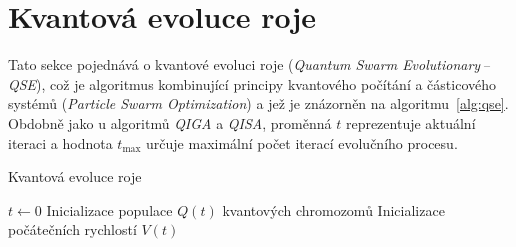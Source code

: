 \section{Kvantová evoluce roje}\label{sec:qse}
Tato sekce pojednává o kvantové evoluci roje (\emph{Quantum Swarm Evolutionary\,--\,QSE}), což je algoritmus kombinující principy kvantového počítání a částicového systémů (\emph{Particle Swarm Optimization}) a jež je znázorněn na algoritmu~\ref{alg:qse}. 
Obdobně jako u algoritmů \emph{QIGA} a \emph{QISA}, proměnná $t$ reprezentuje aktuální iteraci a hodnota $t_{\text{max}}$ určuje maximální počet iterací evolučního procesu.

\begin{algorithm}[ht]
    \caption{Kvantová evoluce roje~\cite{qse}}
    \label{alg:qse}
    $t \gets 0$\;
    Inicializace populace $Q\left(t\right)$ kvantových chromozomů\;
    Inicializace počátečních rychlostí $V\left(t\right)$\;
\end{algorithm}

